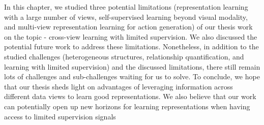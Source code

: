 In this chapter, we studied three potential limitations (representation learning with a large number of
views, self-supervised learning beyond visual modality, and multi-view representation learning for action
generation) of our thesis work on the topic - cross-view learning with limited supervision. We also discussed
the potential future work to address these limitations. Nonetheless, in addition to the studied challenges
(heterogeneous structures, relationship quantification, and learning with limited supervision) and the
discussed limitations, there still remain lots of challenges and sub-challenges waiting for us to solve. To
conclude, we hope that our thesis sheds light on advantages of leveraging information across different data
views to learn good representations. We also believe that our work can potentially open up new horizons
for learning representations when having access to limited supervision signals